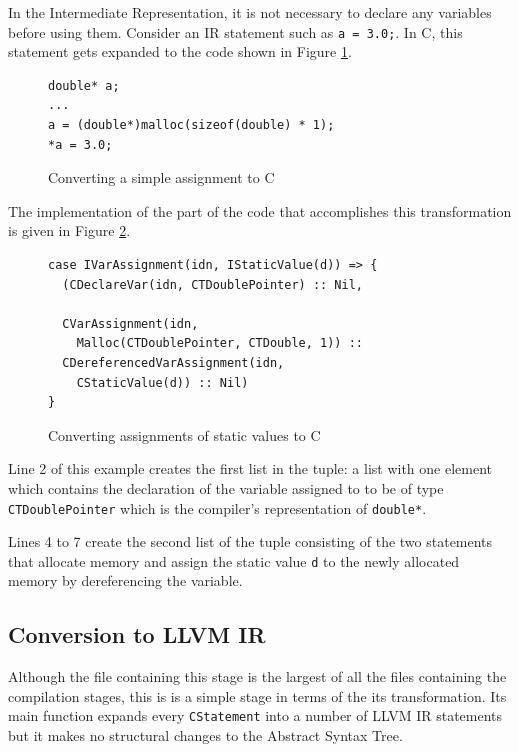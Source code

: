 \documentclass[11pt]{report}
\begin{document}
In the Intermediate Representation, it is not necessary to declare any variables before using them. Consider an IR statement such as \texttt{a = 3.0;}. In C, this statement gets expanded to the code shown in Figure \ref{iconvc1}.
\begin{figure}[ht]
\begin{lstlisting}
double* a;
...
a = (double*)malloc(sizeof(double) * 1);
*a = 3.0;
\end{lstlisting}
\caption{Converting a simple assignment to C}
\label{iconvc1}
\end{figure}

The implementation of the part of the code that accomplishes this transformation is given in Figure \ref{iconvc2}.

\begin{figure}[ht]
\begin{lstlisting}
case IVarAssignment(idn, IStaticValue(d)) => {
  (CDeclareVar(idn, CTDoublePointer) :: Nil,
  
  CVarAssignment(idn, 
    Malloc(CTDoublePointer, CTDouble, 1)) ::
  CDereferencedVarAssignment(idn, 
    CStaticValue(d)) :: Nil)
}
\end{lstlisting}
\caption{Converting assignments of static values to C}
\label{iconvc2}
\end{figure}

Line 2 of this example creates the first list in the tuple: a list with one element which contains the declaration of the variable assigned to to be of type \texttt{CTDoublePointer} which is the compiler's representation of \texttt{double*}.

Lines 4 to 7 create the second list of the tuple consisting of the two statements that allocate memory and assign the static value \texttt{d} to the newly allocated memory by dereferencing the variable.



\subsection{Conversion to LLVM IR}

Although the file containing this stage is the largest of all the files containing the compilation stages, this is is a simple stage in terms of the its transformation. Its main function expands every \texttt{CStatement} into a number of LLVM IR statements but it makes no structural changes to the Abstract Syntax Tree.
\end{document}
